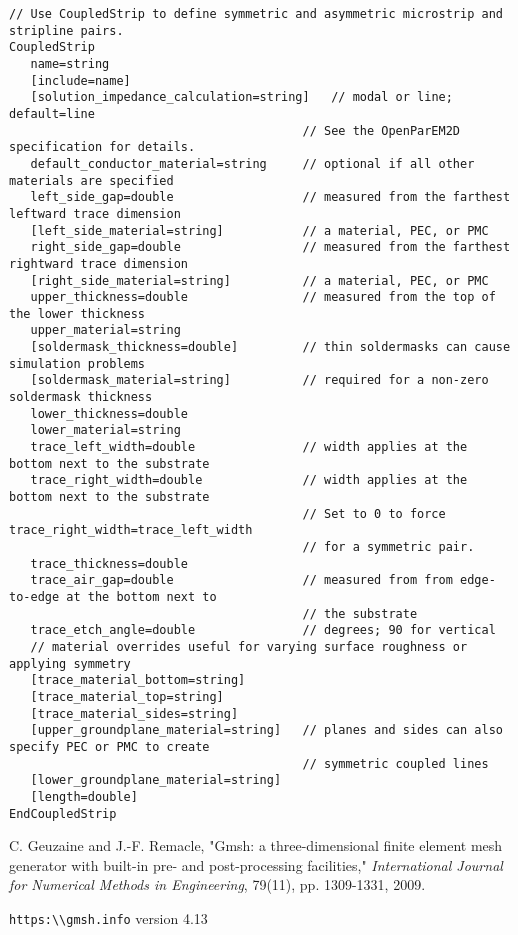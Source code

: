 \documentclass[titlepage]{article}
\renewcommand\_{\textunderscore\linebreak[1]}
\begin{document}
\begin{Verbatim}[fontsize=\small]
// Use CoupledStrip to define symmetric and asymmetric microstrip and stripline pairs.
CoupledStrip
   name=string
   [include=name]
   [solution_impedance_calculation=string]   // modal or line; default=line
                                         // See the OpenParEM2D specification for details.
   default_conductor_material=string     // optional if all other materials are specified
   left_side_gap=double                  // measured from the farthest leftward trace dimension
   [left_side_material=string]           // a material, PEC, or PMC
   right_side_gap=double                 // measured from the farthest rightward trace dimension
   [right_side_material=string]          // a material, PEC, or PMC
   upper_thickness=double                // measured from the top of the lower thickness
   upper_material=string
   [soldermask_thickness=double]         // thin soldermasks can cause simulation problems
   [soldermask_material=string]          // required for a non-zero soldermask thickness
   lower_thickness=double
   lower_material=string
   trace_left_width=double               // width applies at the bottom next to the substrate
   trace_right_width=double              // width applies at the bottom next to the substrate
                                         // Set to 0 to force trace_right_width=trace_left_width 
                                         // for a symmetric pair.
   trace_thickness=double
   trace_air_gap=double                  // measured from from edge-to-edge at the bottom next to 
                                         // the substrate
   trace_etch_angle=double               // degrees; 90 for vertical
   // material overrides useful for varying surface roughness or applying symmetry
   [trace_material_bottom=string]
   [trace_material_top=string]
   [trace_material_sides=string]
   [upper_groundplane_material=string]   // planes and sides can also specify PEC or PMC to create 
                                         // symmetric coupled lines
   [lower_groundplane_material=string]
   [length=double]
EndCoupledStrip

\end{Verbatim}

\begin{thebibliography}{unsrt}

 C. Geuzaine and J.-F. Remacle, "Gmsh: a three-dimensional finite element mesh generator with built-in pre- and post-processing facilities," \textit{International Journal for Numerical Methods in Engineering}, 79(11), pp. 1309-1331, 2009.

 \verb+https:\\gmsh.info+ version 4.13

\end{thebibliography}
\end{document}
